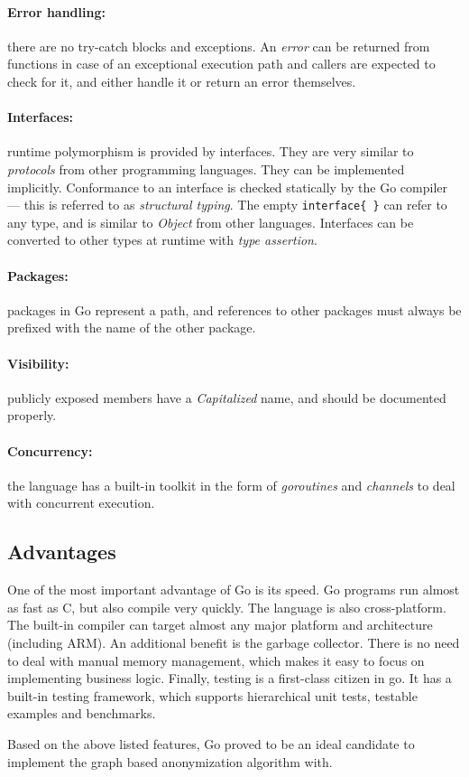 \paragraph{Error handling:} there are no try-catch blocks and exceptions. An \textit{error} can be returned from functions in case of an exceptional execution path and callers are expected to check for it, and either handle it or return an error themselves.

\paragraph{Interfaces:} runtime polymorphism is provided by interfaces. They are very similar to \textit{protocols} from other programming languages. They can be implemented implicitly. Conformance to an interface is checked statically by the Go compiler --- this is referred to as \textit{structural typing}.
The empty \texttt{interface\{ \}} can refer to any type, and is similar to \textit{Object} from other languages. Interfaces can be converted to other types at runtime with \textit{type assertion}.

\paragraph{Packages:} packages in Go represent a path, and references to other packages must always be prefixed with the name of the other package.

\paragraph{Visibility:} publicly exposed members have a \textit{Capitalized} name, and should be documented properly.

\paragraph{Concurrency:} the language has a built-in toolkit in the form of \textit{goroutines} and \textit{channels} to deal with concurrent execution.

\subsection{Advantages}

One of the most important advantage of Go is its speed. Go programs run almost as fast as C, but also compile very quickly. The language is also cross-platform. The built-in compiler can target almost any major platform and architecture (including ARM). An additional benefit is the garbage collector. There is no need to deal with manual memory management, which makes it easy to focus on implementing business logic. Finally, testing is a first-class citizen in go. It has a built-in testing framework, which supports hierarchical unit tests, testable examples and benchmarks.

Based on the above listed features, Go proved to be an ideal candidate to implement the graph based anonymization algorithm with.
